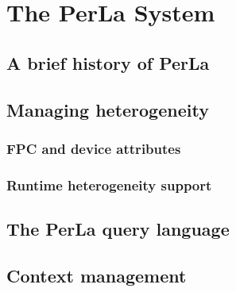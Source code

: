 \chapter{The PerLa System}

\section{A brief history of PerLa}

\section{Managing heterogeneity}

\subsection{FPC and device attributes}

\subsection{Runtime heterogeneity support}

\section{The PerLa query language}

\section{Context management}